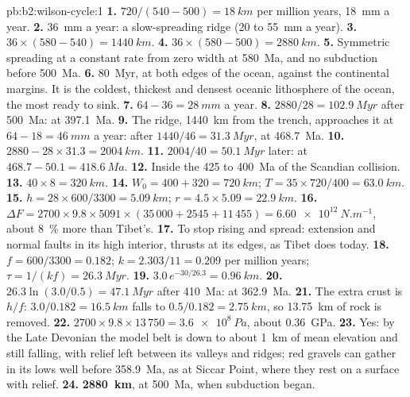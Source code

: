 \begin{solution}{pb:b2:wilson-cycle:1}
\textbf{1.} $720/(540 - 500) = \qty{18}{km}$ per million years, \qty{18}{mm} a year.
\textbf{2.} \qty{36}{mm} a year: a slow-spreading ridge (20 to \qty{55}{mm} a year).
\textbf{3.} $36\times(580 - 540) = \qty{1440}{km}$.
\textbf{4.} $36\times(580 - 500) = \qty{2880}{km}$.
\textbf{5.} Symmetric spreading at a constant rate from zero width at \qty{580}{Ma}, and no
subduction before \qty{500}{Ma}.
\textbf{6.} \qty{80}{Myr}, at both edges of the ocean, against the continental margins. It is the
coldest, thickest and densest oceanic lithosphere of the ocean, the most ready to sink.
\textbf{7.} $64 - 36 = \qty{28}{mm}$ a year.
\textbf{8.} $2880/28 = \qty{102.9}{Myr}$ after \qty{500}{Ma}: at \qty{397.1}{Ma}.
\textbf{9.} The ridge, \qty{1440}{km} from the trench, approaches it at $64 - 18 =
\qty{46}{mm}$ a year: after $1440/46 = \qty{31.3}{Myr}$, at \qty{468.7}{Ma}.
\textbf{10.} $2880 - 28\times31.3 = \qty{2004}{km}$.
\textbf{11.} $2004/40 = \qty{50.1}{Myr}$ later: at $468.7 - 50.1 = \qty{418.6}{Ma}$.
\textbf{12.} Inside the 425 to \qty{400}{Ma} of the Scandian collision.
\textbf{13.} $40\times8 = \qty{320}{km}$.
\textbf{14.} $W_0 = 400 + 320 = \qty{720}{km}$; $T = 35\times720/400 = \qty{63.0}{km}$.
\textbf{15.} $h = 28\times600/3300 = \qty{5.09}{km}$; $r = 4.5\times5.09 = \qty{22.9}{km}$.
\textbf{16.} $\Delta F = 2700\times9.8\times5091\times(35\,000 + 2545 + 11\,455) =
\qty{6.60e12}{N.m^{-1}}$, about \qty{8}{\percent} more than Tibet's.
\textbf{17.} To stop rising and spread: extension and normal faults in its high interior,
thrusts at its edges, as Tibet does today.
\textbf{18.} $f = 600/3300 = 0.182$; $k = 2.303/11 = 0.209$ per million years; $\tau = 1/(kf)
= \qty{26.3}{Myr}$.
\textbf{19.} $3.0\,e^{-30/26.3} = \qty{0.96}{km}$.
\textbf{20.} $26.3\ln(3.0/0.5) = \qty{47.1}{Myr}$ after \qty{410}{Ma}: at \qty{362.9}{Ma}.
\textbf{21.} The extra crust is $h/f$: $3.0/0.182 = \qty{16.5}{km}$ falls to $0.5/0.182 =
\qty{2.75}{km}$, so \qty{13.75}{km} of rock is removed.
\textbf{22.} $2700\times9.8\times13\,750 = \qty{3.6e8}{Pa}$, about \qty{0.36}{GPa}.
\textbf{23.} Yes: by the Late Devonian the model belt is down to about \qty{1}{km} of mean
elevation and still falling, with relief left between its valleys and ridges; red gravels can
gather in its lows well before \qty{358.9}{Ma}, as at Siccar Point, where they rest on a surface
with relief.
\textbf{24.} \textbf{\qty[text-series-to-math=true]{2880}{km}}, at \qty{500}{Ma}, when
subduction began.
\end{solution}
